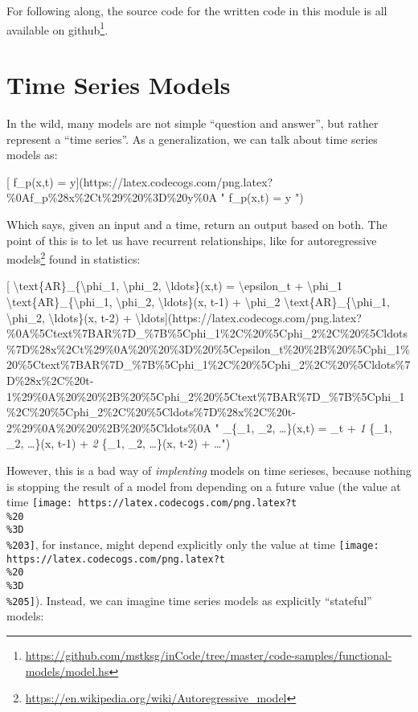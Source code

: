 \documentclass[]{article}
\renewcommand{\href}[2]{#2\footnote{\url{#1}}}
\begin{document}
For following along, the source code for the written code in this module is all
available
\href{https://github.com/mstksg/inCode/tree/master/code-samples/functional-models/model.hs}{on
github}.

\hypertarget{time-series-models}{%
\section{Time Series Models}\label{time-series-models}}

In the wild, many models are not simple ``question and answer'', but rather
represent a ``time series''. As a generalization, we can talk about time series
models as:

{[} f\_p(x,t) =
y{]}(https://latex.codecogs.com/png.latex?\%0Af\_p\%28x\%2Ct\%29\%20\%3D\%20y\%0A
" f\_p(x,t) = y ")

Which says, given an input and a time, return an output based on both. The point
of this is to let us have recurrent relationships, like for
\href{https://en.wikipedia.org/wiki/Autoregressive_model}{autoregressive models}
found in statistics:

{[} \textbackslash{}text\{AR\}\_\{\textbackslash{}phi\_1,
\textbackslash{}phi\_2, \textbackslash{}ldots\}(x,t) =
\textbackslash{}epsilon\_t + \textbackslash{}phi\_1
\textbackslash{}text\{AR\}\_\{\textbackslash{}phi\_1, \textbackslash{}phi\_2,
\textbackslash{}ldots\}(x, t-1) + \textbackslash{}phi\_2
\textbackslash{}text\{AR\}\_\{\textbackslash{}phi\_1, \textbackslash{}phi\_2,
\textbackslash{}ldots\}(x, t-2) +
\textbackslash{}ldots{]}(https://latex.codecogs.com/png.latex?\%0A\%5Ctext\%7BAR\%7D\_\%7B\%5Cphi\_1\%2C\%20\%5Cphi\_2\%2C\%20\%5Cldots\%7D\%28x\%2Ct\%29\%0A\%20\%20\%3D\%20\%5Cepsilon\_t\%20\%2B\%20\%5Cphi\_1\%20\%5Ctext\%7BAR\%7D\_\%7B\%5Cphi\_1\%2C\%20\%5Cphi\_2\%2C\%20\%5Cldots\%7D\%28x\%2C\%20t-1\%29\%0A\%20\%20\%2B\%20\%5Cphi\_2\%20\%5Ctext\%7BAR\%7D\_\%7B\%5Cphi\_1\%2C\%20\%5Cphi\_2\%2C\%20\%5Cldots\%7D\%28x\%2C\%20t-2\%29\%0A\%20\%20\%2B\%20\%5Cldots\%0A
" \_\{\phi\_1, \phi\_2, \ldots\}(x,t) = \epsilon\_t + \phi\emph{1
}\{\phi\_1, \phi\_2, \ldots\}(x, t-1) + \phi\emph{2
}\{\phi\_1, \phi\_2, \ldots\}(x, t-2) + \ldots ")

However, this is a bad way of \emph{implenting} models on time serieses, because
nothing is stopping the result of a model from depending on a future value (the
value at time
\texttt{[image: https://latex.codecogs.com/png.latex?t\\\%20\\\%3D\\\%203]}, for
instance, might depend explicitly only the value at time
\texttt{[image: https://latex.codecogs.com/png.latex?t\\\%20\\\%3D\\\%205]}). Instead,
we can imagine time series models as explicitly ``stateful'' models:
\end{document}

